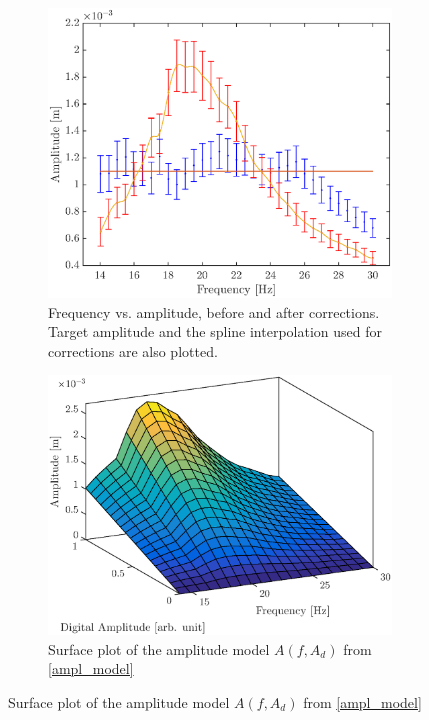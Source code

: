\documentclass[12pt,oneside,a4paper]{article}
\numberwithin{equation}{section}
\begin{document}
{{{{\begin{figure}[h]
	\centering
	\begin{subfigure}[t]{0.49\textwidth}
		\centering
		\includegraphics[width=\textwidth]{amplcorr2.eps} 
		\caption{Frequency vs. amplitude, before and after corrections. Target amplitude and the spline interpolation used for corrections are also plotted.}
		\label{frq_vs_ampl_plot}
	\end{subfigure}\hfill
	\begin{subfigure}[t]{0.49\textwidth}
		\centering
		\includegraphics[width=\textwidth]{surfplot}
		\caption{Surface plot of the amplitude model $A(f,A_{d})$ from \eqref{ampl_model}}

\end{subfigure}
\end{figure}}}}}
\end{document}
